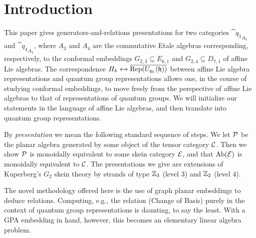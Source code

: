 \section{Introduction}

This paper gives generators-and-relations presentations for two categories $\cat{q_3}_{A_3}$ and $\cat{q_4}_{A_4}$, where $A_3$ and $A_4$ are the commutative Etale algebras corresponding, respectively, to the conformal embeddings $G_{2,3} \subseteq E_{6,1}$ and $G_{2,4} \subseteq D_{7,1}$ of affine Lie algebras. 
The correspondence $H_k \xleftrightarrow{} \overline{\operatorname{Rep}(U_{q_k}(\mathfrak{h}))}$ between affine Lie algebra representations and quantum group representations \cite{} allows one, in the course of studying conformal embeddings, to move freely from the perspective of affine Lie algebras to that of representations of quantum groups. We will initialize our statements in the language of affine Lie algebras, and then translate into quantum group representations.

By {\it presentation} we mean the following standard sequence of steps. We let $\mathcal{P}$ be the planar algebra generated by some object of the tensor category $\mathcal{C}$. Then we show $\mathcal{P}$ is monoidally equivalent to some skein category $\mathcal{E}$, and that $\operatorname{Ab}(\mathcal{E})$ is monoidally equivalent to $\mathcal{C}$. The presentations we give are extensions of Kuperberg's $G_2$ skein theory by strands of type $\mathbb{Z}_3$ (level 3) and $\mathbb{Z}_2$ (level 4). 

The novel methodology offered here is the use of graph planar embeddings to deduce relations. Computing, e.g., the relation (Change of Basis) purely in the context of quantum group representations is daunting, to say the least. With a GPA embedding in hand, however, this becomes an elementary linear algebra problem. 